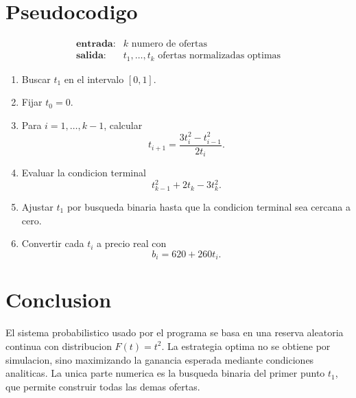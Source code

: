\documentclass[11pt]{article}
\begin{document}
\section{Pseudocodigo}

\[
\begin{array}{ll}
\textbf{entrada:} & k \text{ numero de ofertas} \\
\textbf{salida:} & t_1,\ldots,t_k \text{ ofertas normalizadas optimas}
\end{array}
\]

\begin{enumerate}
  \item Buscar \(t_1\) en el intervalo \([0,1]\).
  \item Fijar \(t_0=0\).
  \item Para \(i=1,\ldots,k-1\), calcular
  \[
    t_{i+1}=\frac{3t_i^2-t_{i-1}^2}{2t_i}.
  \]
  \item Evaluar la condicion terminal
  \[
    t_{k-1}^2 + 2t_k - 3t_k^2.
  \]
  \item Ajustar \(t_1\) por busqueda binaria hasta que la condicion terminal sea
  cercana a cero.
  \item Convertir cada \(t_i\) a precio real con
  \[
    b_i=620+260t_i.
  \]
\end{enumerate}

\section{Conclusion}

El sistema probabilistico usado por el programa se basa en una reserva aleatoria
continua con distribucion \(F(t)=t^2\). La estrategia optima no se obtiene por
simulacion, sino maximizando la ganancia esperada mediante condiciones
analiticas. La unica parte numerica es la busqueda binaria del primer punto
\(t_1\), que permite construir todas las demas ofertas.
\end{document}

